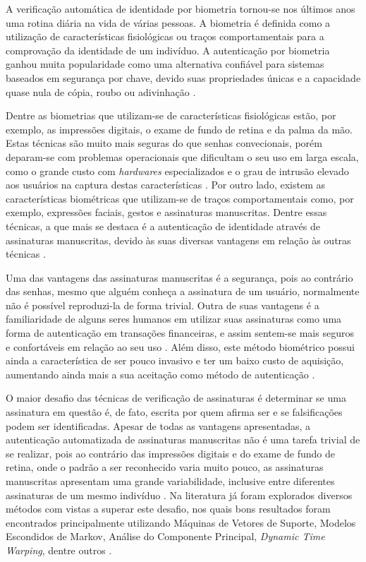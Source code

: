 

A verificação automática de identidade por biometria tornou-se nos últimos anos uma rotina diária na vida de várias pessoas. A biometria é definida como a utilização de características fisiológicas ou traços comportamentais para a comprovação da identidade de um indivíduo. A autenticação por biometria ganhou muita popularidade como uma alternativa confiável para sistemas baseados em segurança por chave, devido suas propriedades únicas e a capacidade quase nula de cópia, roubo ou adivinhação \cite{kholmatov}.

Dentre as biometrias que utilizam-se de características fisiológicas estão, por exemplo, as impressões digitais, o exame de fundo de retina e da palma da mão. Estas técnicas são muito mais seguras do que senhas convecionais, porém deparam-se com problemas operacionais que dificultam o seu uso em larga escala, como o grande custo com \emph{hardwares} especializados e o grau de intrusão elevado aos usuários na captura destas características \cite{[5]noheinen2002}. Por outro lado, existem as características biométricas que utilizam-se de traços comportamentais como, por exemplo, expressões faciais, gestos e assinaturas manuscritas. Dentre essas técnicas, a que mais se destaca é a autenticação de identidade através de assinaturas manuscritas, devido às suas diversas vantagens em relação às outras técnicas \cite{heinen2002}.

Uma das vantagens das assinaturas manuscritas é a segurança, pois ao contrário das senhas, mesmo que alguém conheça a assinatura de um usuário, normalmente não é possível reproduzi-la de forma trivial. Outra de suas vantagens é a familiaridade de alguns seres humanos em utilizar suas assinaturas como uma forma de autenticação em transações financeiras, e assim sentem-se mais seguros e confortáveis em relação ao seu uso \cite{heinen2004}. Além disso, este método biométrico possui ainda a característica de ser pouco invasivo e ter um baixo custo de aquisição, aumentando ainda mais a sua aceitação como método de autenticação \cite{souza2009}.


O maior desafio das técnicas de verificação de assinaturas é determinar se uma assinatura em questão é, de fato, escrita por quem afirma ser e se falsificações podem ser identificadas. Apesar de todas as vantagens apresentadas, a autenticação automatizada de assinaturas manuscritas não é uma tarefa trivial de se realizar, pois ao contrário das impressões digitais e do exame de fundo de retina, onde o padrão a ser reconhecido varia muito pouco, as assinaturas manuscritas apresentam uma grande variabilidade, inclusive entre diferentes assinaturas de um mesmo indivíduo \cite{heinen2002}. Na literatura já foram explorados diversos métodos com vistas a superar este desafio, nos quais bons resultados foram encontrados principalmente utilizando Máquinas de Vetores de Suporte, Modelos Escondidos de Markov, Análise do Componente Principal, \emph{Dynamic Time Warping}, dentre outros \cite{souza2009}.

